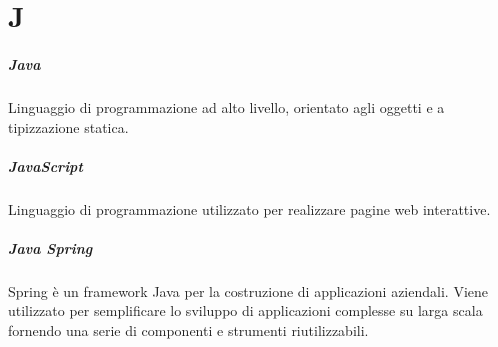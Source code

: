 \chapter{J}

\paragraph*{Java}
Linguaggio di programmazione ad alto livello, orientato agli oggetti e a tipizzazione statica.

\paragraph*{JavaScript}
Linguaggio di programmazione utilizzato per realizzare pagine web interattive.

\paragraph*{Java Spring}
Spring è un framework Java per la costruzione di applicazioni aziendali. Viene utilizzato per semplificare lo sviluppo di applicazioni complesse su larga scala fornendo una serie di componenti e strumenti riutilizzabili.